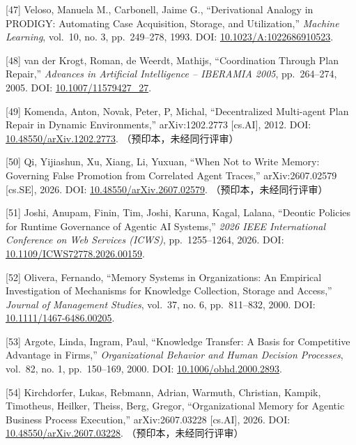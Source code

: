 \documentclass[
]{article}
\begin{document}
{[}47{]} Veloso, Manuela M., Carbonell, Jaime G., ``Derivational Analogy
in PRODIGY: Automating Case Acquisition, Storage, and Utilization,''
\emph{Machine Learning}, vol.~10, no. 3, pp.~249--278, 1993. DOI:
\href{https://doi.org/10.1023/A:1022686910523}{10.1023/A:1022686910523}.

{[}48{]} van der Krogt, Roman, de Weerdt, Mathijs, ``Coordination
Through Plan Repair,'' \emph{Advances in Artificial Intelligence --
IBERAMIA 2005}, pp.~264--274, 2005. DOI:
\href{https://doi.org/10.1007/11579427_27}{10.1007/11579427\_27}.

{[}49{]} Komenda, Anton\textquotesingle{}\in, Nov\textquotesingle ak,
Peter, P\vechou\vcek, Michal, ``Decentralized Multi-agent Plan Repair in
Dynamic Environments,'' arXiv:1202.2773 {[}cs.AI{]}, 2012. DOI:
\href{https://doi.org/10.48550/arXiv.1202.2773}{10.48550/arXiv.1202.2773}.
（预印本，未经同行评审）

{[}50{]} Qi, Yijiashun, Xu, Xiang, Li, Yuxuan, ``When Not to Write
Memory: Governing False Promotion from Correlated Agent Traces,''
arXiv:2607.02579 {[}cs.SE{]}, 2026. DOI:
\href{https://doi.org/10.48550/arXiv.2607.02579}{10.48550/arXiv.2607.02579}.
（预印本，未经同行评审）

{[}51{]} Joshi, Anupam, Finin, Tim, Joshi, Karuna, Kagal, Lalana,
``Deontic Policies for Runtime Governance of Agentic AI Systems,''
\emph{2026 IEEE International Conference on Web Services (ICWS)},
pp.~1255--1264, 2026. DOI:
\href{https://doi.org/10.1109/ICWS72778.2026.00159}{10.1109/ICWS72778.2026.00159}.

{[}52{]} Olivera, Fernando, ``Memory Systems in Organizations: An
Empirical Investigation of Mechanisms for Knowledge Collection, Storage
and Access,'' \emph{Journal of Management Studies}, vol.~37, no. 6,
pp.~811--832, 2000. DOI:
\href{https://doi.org/10.1111/1467-6486.00205}{10.1111/1467-6486.00205}.

{[}53{]} Argote, Linda, Ingram, Paul, ``Knowledge Transfer: A Basis for
Competitive Advantage in Firms,'' \emph{Organizational Behavior and
Human Decision Processes}, vol.~82, no. 1, pp.~150--169, 2000. DOI:
\href{https://doi.org/10.1006/obhd.2000.2893}{10.1006/obhd.2000.2893}.

{[}54{]} Kirchdorfer, Lukas, Rebmann, Adrian, Warmuth, Christian,
Kampik, Timotheus, Heilker, Theiss, Berg, Gregor, ``Organizational
Memory for Agentic Business Process Execution,'' arXiv:2607.03228
{[}cs.AI{]}, 2026. DOI:
\href{https://doi.org/10.48550/arXiv.2607.03228}{10.48550/arXiv.2607.03228}.
（预印本，未经同行评审）
\end{document}
